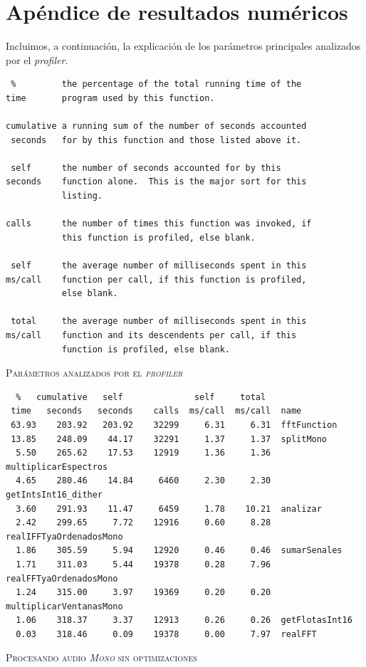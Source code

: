 \documentclass[%
    compressed,
    titlepage,
    narroweqnarray,
    inline,
    twoside,
    ]{ieee}
\begin{document}
\newpage

\section{Ap\'endice de resultados num\'ericos}

Incluimos, a continuaci\'on, la explicaci\'on de los par\'ametros principales analizados por el \textit{profiler}.

{\small
\begin{lstlisting}
 %         the percentage of the total running time of the
time       program used by this function.

cumulative a running sum of the number of seconds accounted
 seconds   for by this function and those listed above it.

 self      the number of seconds accounted for by this
seconds    function alone.  This is the major sort for this
           listing.

calls      the number of times this function was invoked, if
           this function is profiled, else blank.

 self      the average number of milliseconds spent in this
ms/call    function per call, if this function is profiled,
           else blank.

 total     the average number of milliseconds spent in this
ms/call    function and its descendents per call, if this
           function is profiled, else blank.
\end{lstlisting}
}
\begin{center} \textsc{Par\'ametros analizados por el \textit{profiler}} \end{center}


{\small
\begin{lstlisting}
  %   cumulative   self              self     total
 time   seconds   seconds    calls  ms/call  ms/call  name
 63.93    203.92   203.92    32299     6.31     6.31  fftFunction
 13.85    248.09    44.17    32291     1.37     1.37  splitMono
  5.50    265.62    17.53    12919     1.36     1.36  multiplicarEspectros
  4.65    280.46    14.84     6460     2.30     2.30  getIntsInt16_dither
  3.60    291.93    11.47     6459     1.78    10.21  analizar
  2.42    299.65     7.72    12916     0.60     8.28  realIFFTyaOrdenadosMono
  1.86    305.59     5.94    12920     0.46     0.46  sumarSenales
  1.71    311.03     5.44    19378     0.28     7.96  realFFTyaOrdenadosMono
  1.24    315.00     3.97    19369     0.20     0.20  multiplicarVentanasMono
  1.06    318.37     3.37    12913     0.26     0.26  getFlotasInt16
  0.03    318.46     0.09    19378     0.00     7.97  realFFT
\end{lstlisting}
}
\begin{center} \textsc{Procesando audio \textit{Mono} sin optimizaciones} \end{center}
\end{document}
